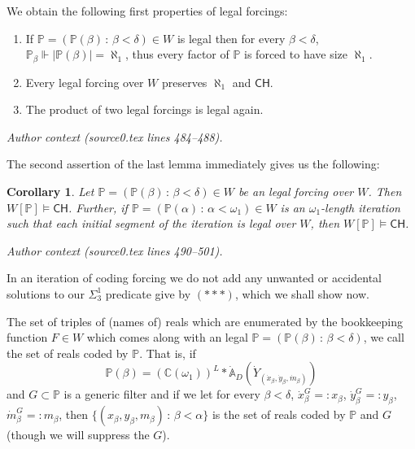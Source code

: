\documentclass[10pt,a4paper]{amsart}
\newcommand{\CH}{\mathsf{CH}}
\newcommand{\forceP}{\mathbb{P}}
\newtheorem{corollary}{Corollary}
\begin{document}
 We obtain the following first properties of legal  forcings:
 \begin{lemma} 


\begin{enumerate}
\item If $\forceP=(\forceP(\beta) \, : \, \beta < \delta) \in W$ is legal  then for every $\beta < \delta$, $\forceP_{\beta} \Vdash| \forceP(\beta)|= \aleph_1$, thus every factor of $\forceP$ is forced to have size $\aleph_1$.
\item Every legal  forcing over $W$ preserves $\aleph_1$ and $\CH$.
\item The product of two legal  forcings is legal  again.
\end{enumerate}
\end{lemma}
\par\medskip\noindent\textit{Author context (source0.tex lines 484--488).}\par\smallskip
The second assertion of the last lemma immediately gives us the following:
\begin{corollary}
Let $\forceP= (\forceP(\beta) \, : \, \beta < \delta) \in W$ be an legal  forcing over $W$. Then $W[\forceP] \models \CH$. Further, if $\forceP= (\forceP(\alpha) \, : \, \alpha < \omega_1) \in W$ is an $\omega_1$-length iteration such that each initial segment of the iteration is legal  over $W$, then $W[\forceP] \models \CH$.

\end{corollary}
\par\medskip\noindent\textit{Author context (source0.tex lines 490--501).}\par\smallskip
In an iteration of coding forcing we do not add any unwanted or accidental solutions to our $\Sigma^1_3$ predicate give by $({\ast} {\ast} {\ast})$, which we shall show now.

The set of triples of (names of) reals which are enumerated by the bookkeeping function $F \in W$ which comes along with an legal $\forceP = (\forceP(\beta) \, : \, \beta < \delta)$, we call the set of reals coded by $\forceP$. That is, if \[ \forceP(\beta)= (\mathbb{C}(\omega_1))^L \ast \dot{\mathbb{A}}_D (\dot{Y}_{(\dot{x}_{\beta}, \dot{y}_{\beta}, \dot{m}_{\beta} ) } ) \] and $G \subset \forceP$ is a generic filter and if we let for every $\beta < \delta$,
$ \dot{x}_{\beta}^G =:x_{\beta}$, $\dot{y}_{\beta}^G =:y_{\beta}$, $\dot{m}_{\beta}^G =:m_{\beta}$,  then
$\{ (x_{\beta},y_{\beta},m_{\beta} ) \, : \, \beta < \alpha \}$ is the set of reals coded by $\forceP$ and $G$ (though we will suppress the $G$).
\end{document}

